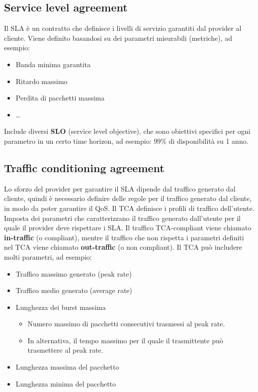 \subsection{Service level agreement}
Il SLA è un contratto che definisce i livelli di servizio garantiti dal provider al cliente.
Viene definito basandosi su dei parametri misurabili (metriche), ad esempio:
\begin{itemize}
	\item Banda minima garantita
	\item Ritardo massimo
	\item Perdita di pacchetti massima
	\item \ldots
\end{itemize}
Include diversi \textbf{SLO} (service level objective), che sono obiettivi specifici per ogni parametro in un certo time horizon, ad esempio: 99\% di disponibilità su 1 anno.
\subsection{Traffic conditioning agreement}
Lo sforzo del provider per garantire il SLA dipende dal traffico generato dal cliente, quindi è necessario definire delle regole per il traffico generato dal cliente, in modo da poter garantire il QoS.
Il TCA definisce i profili di traffico dell'utente.
Imposta dei parametri che caratterizzano il traffico generato dall'utente per il quale il provider deve rispettare i SLA.
Il traffico TCA-compliant viene chiamato \textbf{in-traffic} (o compliant), mentre il traffico che non rispetta i parametri definiti nel TCA viene chiamato \textbf{out-traffic} (o non compliant).
Il TCA può includere molti parametri, ad esempio:
\begin{itemize}
	\item Traffico massimo generato (peak rate)
	\item Traffico medio generato (average rate)
	\item Lunghezza dei burst massima
	\begin{itemize}
		\item Numero massimo di pacchetti consecutivi trasmessi al peak rate.
		\item In alternativa, il tempo massimo per il quale il trasmittente può trasmettere al peak rate.
	\end{itemize}
	\item Lunghezza massima del pacchetto
	\item Lunghezza minima del pacchetto
\end{itemize}
